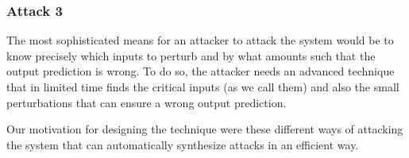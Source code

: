 \subsubsection{Attack 3}
The most sophisticated means for an attacker to attack the system would be to know precisely which inputs to perturb and by what amounts such that the output prediction is wrong. 
To do so, the attacker needs an advanced technique that in limited time finds the critical inputs (as we call them) and also the small perturbations that can ensure a wrong output prediction. 


Our motivation for designing the technique were these different ways of attacking the system that can automatically synthesize attacks in an efficient way. 













